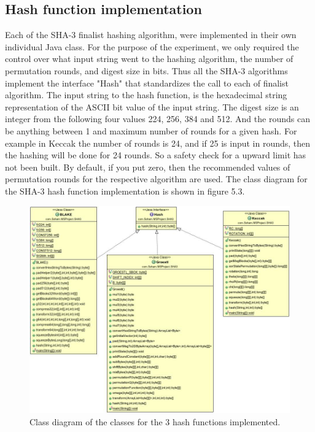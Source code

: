 \subsection{Hash function implementation}

Each of the SHA-3 finalist hashing algorithm, were implemented in their own individual Java class. For the purpose
of the experiment, we only required the control over what input string went to the hashing algorithm, the number
of permutation rounds, and digest size in bits. Thus all the SHA-3 algorithms implement the interface "Hash" that
standardizes the call to each of finalist algorithm. The input string to the hash function, is the hexadecimal 
string representation of the ASCII bit value of the input string. The digest size is an integer from the following
four values 224, 256, 384 and 512. And the rounds can be anything between 1 and maximum number of rounds for a
given hash. For example in Keccak the number of rounds is 24, and if 25 is input in rounds, then the hashing will
be done for 24 rounds. So a safety check for a upward limit has not been built. By default, if you put zero, then
the recommended values of permutation rounds for the respective algorithm are used. The class diagram for the
SHA-3 hash function implementation is shown in figure 5.3.

\begin{figure}
  \begin{center}
    \includegraphics[width=6.8	in]{SHA3classes.jpg}
  \end{center}
  \caption{Class diagram of the classes for the 3 hash functions implemented.}
  \label{fig:UMLSHA3classes}
\end{figure}

